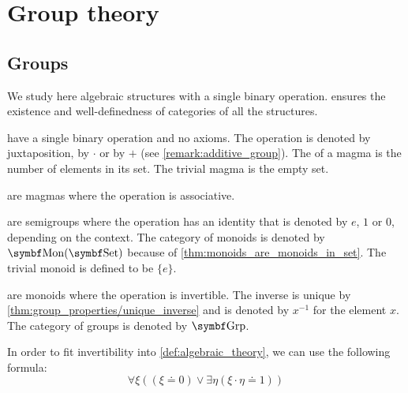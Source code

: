 \section{Group theory}\label{sec:group_theory}
\subsection{Groups}\label{subsec:groups}

\begin{definition}\label{def:magma}
  We study here algebraic structures with a single binary operation.  ensures the existence and well-definedness of categories of all the structures.

  \begin{itemize}
      have a single binary operation and no axioms. The operation is denoted by juxtaposition, by \( \cdot \) or by \( + \) (see \cref{remark:additive_group}). The  of a magma is the number of elements in its set. The trivial magma is the empty set.

      are magmas where the operation is associative.

      are semigroups where the operation has an identity that is denoted by \( e \), \( 1 \) or \( 0 \), depending on the context. The category of monoids is denoted by \( \Cat{Mon}(\Cat{Set}) \) because of \cref{thm:monoids_are_monoids_in_set}. The trivial monoid is defined to be \( \{ e \} \).

      are monoids where the operation is invertible. The inverse is unique by \cref{thm:group_properties/unique_inverse} and is denoted by \( x^{-1} \) for the element \( x \). The category of groups is denoted by \( \Cat{Grp} \).

    In order to fit invertibility into \cref{def:algebraic_theory}, we can use the following formula:
    \begin{equation*}
      \forall \xi ((\xi \doteq 0) \lor \exists \eta (\xi \cdot \eta \doteq 1))
    \end{equation*}


\end{itemize}
\end{definition}
